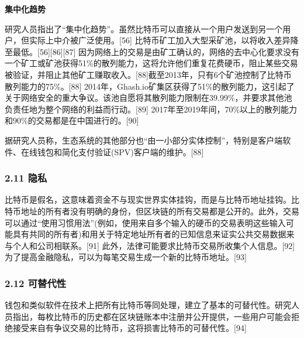 \textbf{集中化趋势}

研究人员指出了“集中化趋势”。虽然比特币可以直接从一个用户发送到另一个用户，但实际上中介被广泛使用。[56] 比特币矿工加入大型采矿池，以将收入差异降至最低。[56][86][87] 因为网络上的交易是由矿工确认的，网络的去中心化要求没有一个矿工或矿池获得51\%的散列能力，这将允许他们重复花费硬币，阻止某些交易被验证，并阻止其他矿工赚取收入。[88]截至2013年，只有6个矿池控制了比特币散列能力的75\%。[88] 2014年，Ghash.io矿集区获得了51\%的散列能力，这引起了关于网络安全的重大争议。该池自愿将其散列能力限制在39.99\%，并要求其他池负责任地为整个网络的利益而行动。[89] 2017年至2019年间，70\%以上的散列能力和90\%的交易都是在中国进行的。[90]

据研究人员称，生态系统的其他部分也“由一小部分实体控制”，特别是客户端软件、在线钱包和简化支付验证(SPV)客户端的维护。[88]
\subsubsection{2.11 隐私}
比特币是假名，这意味着资金不与现实世界实体挂钩，而是与比特币地址挂钩。比特币地址的所有者没有明确的身份，但区块链的所有交易都是公开的。此外，交易可以通过“使用习惯用法”(例如，使用来自多个输入的硬币的交易表明这些输入可能具有共同的所有者)和用关于特定地址所有者的已知信息来证实公共交易数据来与个人和公司相联系。[91] 此外，法律可能要求比特币交易所收集个人信息。[92] 为了提高金融隐私，可以为每笔交易生成一个新的比特币地址。[93]
\subsubsection{2.12 可替代性}
钱包和类似软件在技术上把所有比特币等同处理，建立了基本的可替代性。研究人员指出，每枚比特币的历史都在区块链账本中注册并公开提供，一些用户可能会拒绝接受来自有争议交易的比特币，这将损害比特币的可替代性。[94]
\subsubsection{}